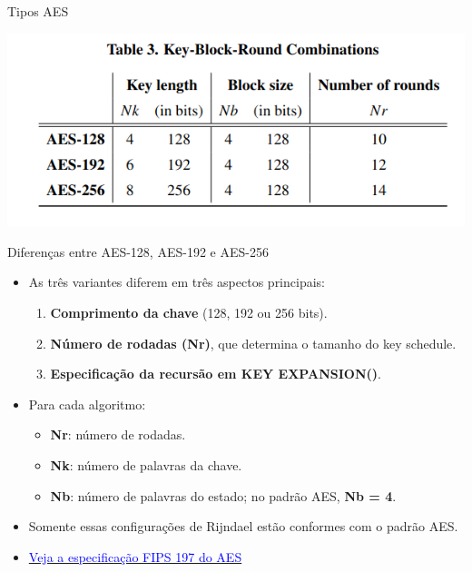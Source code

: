 \begin{frame}{Tipos AES}


    \centering
    \includegraphics[width=0.9\linewidth]{Figuras/tipos-aes.png}

\end{frame}

\begin{frame}{Diferenças entre AES-128, AES-192 e AES-256}
    \begin{itemize}
        \item As três variantes diferem em três aspectos principais:
              \begin{enumerate}
                  \item \textbf{Comprimento da chave} (128, 192 ou 256 bits).
                  \item \textbf{Número de rodadas (Nr)}, que determina o tamanho do key schedule.
                  \item \textbf{Especificação da recursão em KEY EXPANSION()}.
              \end{enumerate}
        \item Para cada algoritmo:
              \begin{itemize}
                  \item \textbf{Nr}: número de rodadas.
                  \item \textbf{Nk}: número de palavras da chave.
                  \item \textbf{Nb}: número de palavras do estado; no padrão AES, \textbf{Nb = 4}.
              \end{itemize}
        \item Somente essas configurações de Rijndael estão conformes com o padrão AES.

        \item  \href{https://csrc.nist.gov/pubs/fips/197/final}{\textcolor{blue}{Veja a especificação FIPS 197 do AES}}
    \end{itemize}


\end{frame}


